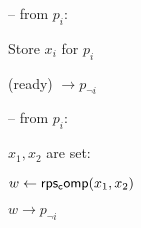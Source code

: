 \begin{bbox}[title={\textbf{Functionality} $\F_{\msf{RPS}}$}]

-- \OnInput {} from $p_i$:

	\qquad Store $x_i$ for $p_i$

	\qquad \Send (ready) $\rightarrow p_{\neg i}$

-- \OnInput {} from $p_i$:

	\qquad \If $x_1,x_2$ are set:

		\qqquad $w \leftarrow {\mathsf {rps_comp}}(x_1,x_2)$

		\qqquad  \Send $w \rightarrow p_{\neg i}$

\end{bbox}
